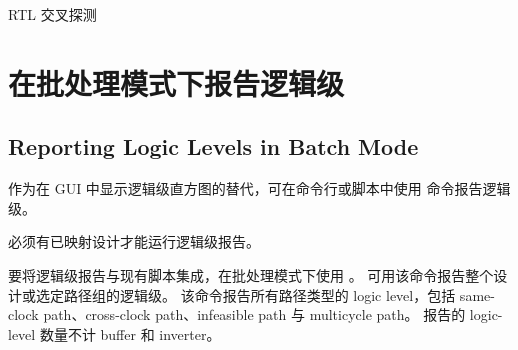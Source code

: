 \begin{seeAlsoBox}
RTL 交叉探测
\end{seeAlsoBox}

\section{在批处理模式下报告逻辑级}
\subsection*{Reporting Logic Levels in Batch Mode}

作为在 GUI 中显示逻辑级直方图的替代，可在命令行或脚本中使用  命令报告逻辑级。

\begin{noteBox}
必须有已映射设计才能运行逻辑级报告。
\end{noteBox}

要将逻辑级报告与现有脚本集成，在批处理模式下使用 。
可用该命令报告整个设计或选定路径组的逻辑级。
该命令报告所有路径类型的 logic level，包括 same-clock path、cross-clock path、infeasible path 与 multicycle path。
报告的 logic-level 数量不计 buffer 和 inverter。

